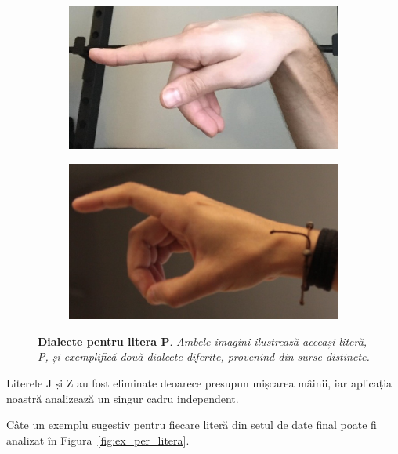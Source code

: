 \begin{figure}[H]
  \centering
  \begin{subfigure}{0.3\textwidth}
    \includegraphics[width=\linewidth]{images/2-recunoasterea-asl/p_dialect1.png}
    \caption{}
    \label{fig:img1}
  \end{subfigure}
    \hspace{0.1\textwidth}
  \begin{subfigure}{0.3\textwidth}
    \includegraphics[width=\linewidth]{images/2-recunoasterea-asl/p_dialect2.png}
    \caption{}
    \label{fig:img2}
  \end{subfigure}
  \caption[Dialecte pentru litera P]{\textbf{Dialecte pentru litera P}. \textit{Ambele imagini ilustrează aceeași literă, P, și exemplifică două dialecte diferite, provenind din surse distincte.}}
  \label{fig:p_2_dialecte}
\end{figure}
Literele J și Z au fost eliminate deoarece presupun mișcarea mâinii, iar aplicația noastră analizează un singur cadru independent.


Câte un exemplu sugestiv pentru fiecare literă din setul de date final poate fi analizat în Figura~\ref{fig:ex_per_litera}.
\captionsetup[subfigure]{labelformat=empty}

